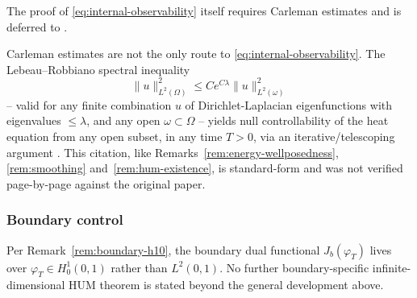 \begin{remark}
  The proof of \eqref{eq:internal-observability} itself requires Carleman
  estimates and is deferred to \citet{fursikov1996imanuvilov}.
\end{remark}

\begin{remark}
  \label{rem:lebeau-robbiano}
  Carleman estimates are not the only route to
  \eqref{eq:internal-observability}. The Lebeau--Robbiano spectral inequality
  \[
    \|u\|^2_{L^2(\Omega)} \le C e^{C\lambda}\|u\|^2_{L^2(\omega)}
  \]
  -- valid for any finite combination $u$ of Dirichlet-Laplacian
  eigenfunctions with eigenvalues $\le\lambda$, and any open $\omega\subset
  \Omega$ -- yields null controllability of the heat equation from any open
  subset, in any time $T>0$, via an iterative/telescoping argument
  \citep{lebeau1995controle}. This citation, like
  Remarks~\ref{rem:energy-wellposedness}, \ref{rem:smoothing}
  and~\ref{rem:hum-existence}, is standard-form and was not verified
  page-by-page against the original paper.
\end{remark}

\subsubsection*{Boundary control}

Per Remark~\ref{rem:boundary-h10}, the boundary dual functional
$J_b(\varphi_T)$ lives over $\varphi_T \in H^1_0(0,1)$ rather than
$L^2(0,1)$. No further boundary-specific infinite-dimensional HUM theorem is
stated beyond the general development above.
